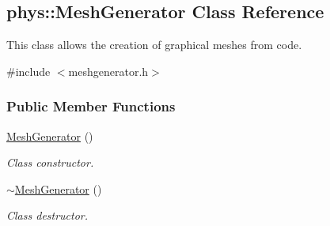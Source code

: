 \hypertarget{classphys_1_1MeshGenerator}{
\subsection{phys::MeshGenerator Class Reference}
\label{df/d6e/classphys_1_1MeshGenerator}
}


This class allows the creation of graphical meshes from code.  




{\ttfamily \#include $<$meshgenerator.h$>$}

\subsubsection*{Public Member Functions}
\begin{DoxyCompactItemize}
\item 
\hypertarget{classphys_1_1MeshGenerator_a70b6d0b67c6e8c833ee2bd85b3265aa7}{
\hyperlink{classphys_1_1MeshGenerator_a70b6d0b67c6e8c833ee2bd85b3265aa7}{MeshGenerator} ()}
\label{df/d6e/classphys_1_1MeshGenerator_a70b6d0b67c6e8c833ee2bd85b3265aa7}

\begin{DoxyCompactList}\small\item\em Class constructor. \item\end{DoxyCompactList}\item 
\hypertarget{classphys_1_1MeshGenerator_a5108974e947a2f0e51d632fd502d0ba0}{
\hyperlink{classphys_1_1MeshGenerator_a5108974e947a2f0e51d632fd502d0ba0}{$\sim$MeshGenerator} ()}
\label{df/d6e/classphys_1_1MeshGenerator_a5108974e947a2f0e51d632fd502d0ba0}

\begin{DoxyCompactList}\small\item\em Class destructor. \item\end{DoxyCompactList}\end{DoxyCompactItemize}
